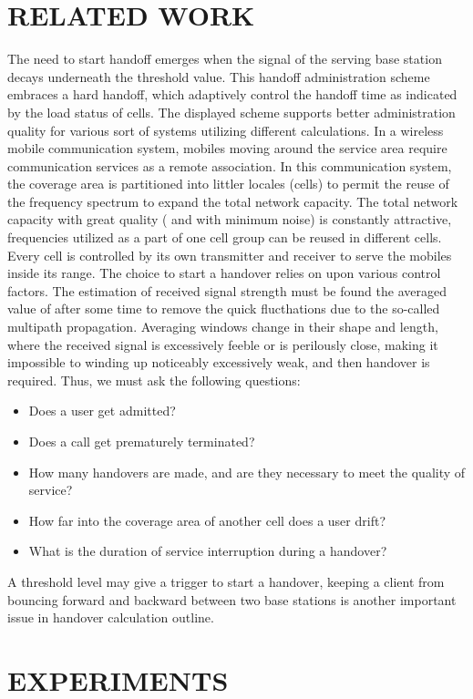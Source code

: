 \documentclass[a4paper]{IEEEtran}
\begin{document}
\section{\textbf{RELATED WORK}}
The need to start handoff emerges when the signal of the serving base station decays underneath the threshold value. This handoff administration scheme embraces a hard handoff, which adaptively control the handoff time as indicated by the load status of cells. The displayed scheme supports better administration quality for various sort of systems utilizing different calculations. In a wireless mobile communication system, mobiles moving around the service area require communication services as a remote association. In this communication system, the coverage area is partitioned into littler locales (cells) to permit the reuse of the frequency spectrum to expand the total network capacity. The total network capacity with great quality ( and with minimum noise) is constantly attractive, frequencies utilized as a part of one cell group can be reused in different cells. Every cell is controlled by its own transmitter and receiver to serve the mobiles inside its range. The choice to start a handover relies on upon various control factors. The estimation of received signal strength must be found the averaged value of after some time to remove the quick flucthations due to the so-called multipath propagation. Averaging windows change in their shape and length, where the received signal is excessively feeble or is perilously close, making it impossible to winding up noticeably excessively weak, and then handover is required. Thus, we must ask the following questions:
\begin{itemize}
\item{Does a user get admitted?}
\item{Does a call get prematurely terminated?}
\item{How many handovers are made, and are they necessary to meet the quality of service?}
\item{How far into the coverage area of another cell does a user drift?}
\item{What is the duration of service interruption during a handover?}
\end{itemize}
A threshold level may give a trigger to start a handover, keeping a client from bouncing forward and backward between two base stations is another important issue in handover calculation outline.
\pagebreak

\section{\textbf{EXPERIMENTS}}
\end{document}
